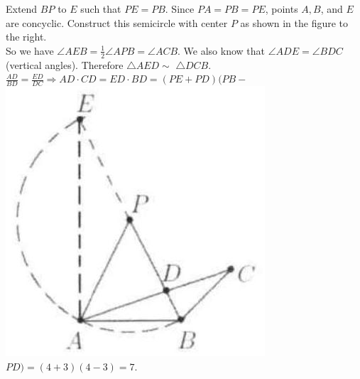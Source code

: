 \documentclass{article}
\begin{document}
Extend \(B P\) to \(E\) such that \(P E=P B\). Since \(P A=P B=P E\), points \(A, B\), and \(E\) are concyclic. Construct this semicircle with center \(P\) as shown in the figure to the right.\\
So we have \(\angle A E B=\frac{1}{2} \angle A P B=\angle A C B\). We also know that \(\angle A D E=\angle B D C\) (vertical angles). Therefore \(\triangle A E D \sim\) \(\triangle D C B\).\\
\(\frac{A D}{B D}=\frac{E D}{D C} \Rightarrow A D \cdot C D=E D \cdot B D=(P E+P D)(P B-\)\\
\includegraphics[width=\textwidth]{images/203(1).jpg} \(P D)=(4+3)(4-3)=7\).
\end{document}
